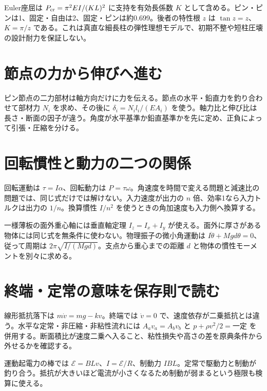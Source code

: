 Euler座屈は \(P_{\rm cr}=\pi^2EI/(KL)^2\) に支持を有効長係数 \(K\) として含める。ピン・ピンは1、固定・自由は2、固定・ピンは約0.699。後者の特性根 \(z\) は \(\tan z=z\)、\(K=\pi/z\) である。これは真直な細長柱の弾性理想モデルで、初期不整や短柱圧壊の設計耐力を保証しない。

\section{節点の力から伸びへ進む}
\label{theory:analysis:truss}
\label{theory:analysis:trussforce}
ピン節点の二力部材は軸方向だけに力を伝える。節点の水平・鉛直力を釣り合わせて部材力 \(N_i\) を求め、その後に \(\delta_i=N_il_i/(EA_i)\) を使う。軸力比と伸び比は長さ・断面の因子が違う。角度が水平基準か鉛直基準かを先に定め、正負によって引張・圧縮を分ける。\cite{mit_material_elastic2000}

\section{回転慣性と動力の二つの関係}
\label{theory:analysis:inertia}
\label{theory:analysis:torque}
\label{theory:analysis:geartorque}
\label{theory:analysis:pendulum}
回転運動は \(\tau=I\alpha\)、回転動力は \(P=\tau\omega\)。角速度を時間で変える問題と減速比の問題では、同じ式だけでは解けない。入力速度が出力の \(n\) 倍、効率1なら入力トルクは出力の \(1/n\)。換算慣性 \(I/n^2\) を使うときの角加速度も入力側へ換算する。

一様薄板の面外重心軸には垂直軸定理 \(I_z=I_x+I_y\) が使える。面外に厚さがある物体には同じ式を無条件に使わない。物理振子の微小角運動は \(I\ddot\theta+Mgd\theta=0\)、従って周期は \(2\pi\sqrt{I/(Mgd)}\)。支点から重心までの距離 \(d\) と物体の慣性モーメントを別々に求める。

\section{終端・定常の意味を保存則で読む}
\label{theory:analysis:terminal}
\label{theory:analysis:bernoulli}
\label{theory:analysis:motional}
線形抵抗落下は \(m\dot v=mg-kv\)。終端では \(\dot v=0\) で、速度依存が二乗抵抗とは違う。水平な定常・非圧縮・非粘性流れには \(A_av_a=A_bv_b\) と \(p+\rho v^2/2=\text{一定}\) を併用する。断面積比が速度二乗へ入ること、粘性損失や高さの差を原典条件から外せるかを確認する。

運動起電力の棒では \(\mathcal E=BLv\)、\(I=\mathcal E/R\)、制動力 \(IBL\)。定常で駆動力と制動が釣り合う。抵抗が大きいほど電流が小さくなるため制動が弱まるという極限も検算に使える。

